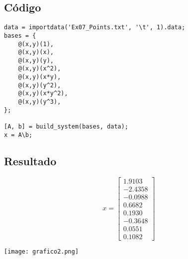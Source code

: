 \documentclass[12pt]{article}
\begin{document}
\subsection{Código}
\begin{verbatim}
data = importdata('Ex07_Points.txt', '\t', 1).data;
bases = {
    @(x,y)(1),
    @(x,y)(x),
    @(x,y)(y),
    @(x,y)(x^2),
    @(x,y)(x*y),
    @(x,y)(y^2),
    @(x,y)(x*y^2),
    @(x,y)(y^3),
};

[A, b] = build_system(bases, data);
x = A\b;
\end{verbatim}

\subsection{Resultado}
\[
    x =
    \begin{bmatrix}
        1.9103 \\
        -2.4358 \\
        -0.0988 \\
        0.6682 \\
        0.1930 \\
        -0.3648 \\
        0.0551 \\
        0.1082
    \end{bmatrix}
\]
\begin{center}
\texttt{[image: grafico2.png]}
\end{center}
\end{document}
